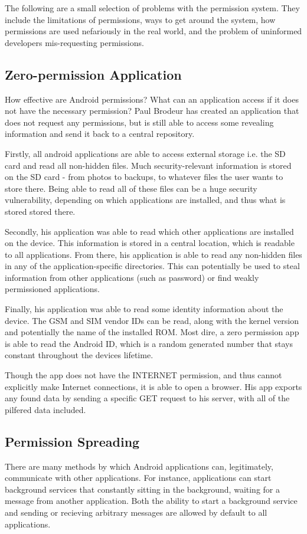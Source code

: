\documentclass[12pt,pdftex]{article}
\begin{document}
\begin{doublespace}
The following are a small selection of problems with the permission system.  They include the limitations of permissions, ways to get around the system, how permissions are used nefariously in the real world, and the problem of uninformed developers mis-requesting permissions.

\subsection{Zero-permission Application}
How effective are Android permissions?  What can an application access if it does not have the necessary permission?  Paul Brodeur has created an application that does not request any permissions, but is still able to access some revealing information and send it back to a central repository.

Firstly, all android applications are able to access external storage i.e. the SD card and read all non-hidden files.  Much security-relevant information is stored on the SD card - from photos to backups, to whatever files the user wants to store there.  Being able to read all of these files can be a huge security vulnerability, depending on which applications are installed, and thus what is stored stored there.

Secondly, his application was able to read which other applications are installed on the device.  This information is stored in a central location, which is readable to all applications.  From there, his application is able to read any non-hidden files in any of the application-specific directories.  This can potentially be used to steal information from other applications (such as password) or find weakly permissioned applications.

Finally, his application was able to read some identity information about the device.  The GSM and SIM vendor IDs can be read, along with the kernel version and potentially the name of the installed ROM.  Most dire, a zero permission app is able to read the Android ID, which is a random generated number that stays constant throughout the devices lifetime.

Though the app does not have the INTERNET permission, and thus cannot explicitly make Internet connections, it is able to open a browser.  His app exports any found data by sending a specific GET request to his server, with all of the pilfered data included. \cite{zeroPer}

\subsection{Permission Spreading}
There are many methods by which Android applications can, legitimately, communicate with other applications.  For instance, applications can start background services that constantly sitting in the background, waiting for a message from another application.  Both the ability to start a background service and sending or recieving arbitrary messages are allowed by default to all applications.


\end{doublespace}
\end{document}
